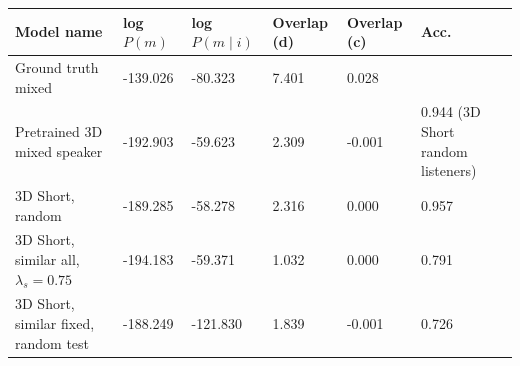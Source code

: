 \begin{table}[] 
	\begin{tabularx}{\textwidth}{|X|l|l|X|X|X|}
		\hline
		\textbf{Model name}                                    & \textbf{log $P(m)$} & \textbf{log $P(m \mid i)$} & \textbf{Overlap (d)} & \textbf{Overlap (c)} & \textbf{Acc.} \\ \hline
		Ground truth mixed       &     -139.026            &    -80.323             &       7.401        &        0.028        &                         \\ \hline
		Pretrained 3D mixed speaker    &      -192.903           &         -59.623               &        2.309              &      -0.001                & 0.944 (3D Short random listeners)        \\ \hline
		3D Short, random&      -189.285             &      -58.278                  &             2.316        &         0.000             &                   0.957      \\ \hline
		3D Short, similar all, $\lambda_s = 0.75$&     -194.183        &   -59.371           &    1.032       &   0.000        &        0.791       \\ \hline
		3D Short, similar fixed, random test&      -188.249           &     -121.830                  &             1.839         &         -0.001             &                   0.726         \\ \hline

\end{tabularx}
\end{table}
